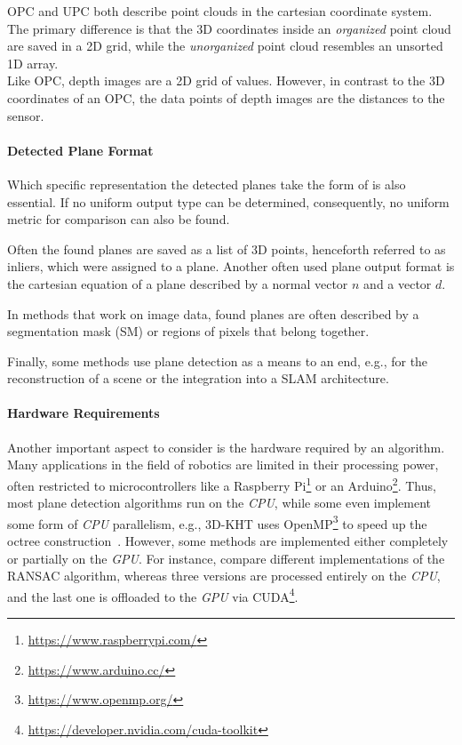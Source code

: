 \documentclass[main.tex]{subfiles}
\begin{document}
OPC and UPC both describe point clouds in the cartesian coordinate system. The primary difference is that the 3D coordinates inside
an \textit{organized} point cloud are saved in a 2D grid, while the \textit{unorganized} point cloud resembles an unsorted 1D array.\\
Like OPC, depth images are a 2D grid of values. However, in contrast to the 3D coordinates of an OPC, the data points of depth images
are the distances to the sensor.



\paragraph{Detected Plane Format} \label{subsec:planeformat}
Which specific representation the detected planes take the form of is also essential.
If no uniform output type can be determined, consequently, no uniform metric for comparison can also be found.


Often the found planes are saved as a list of 3D points, henceforth referred to as inliers, which were assigned to a plane.
Another often used plane output format is the cartesian equation of a plane described by a normal vector $n$ and a vector $d$.

In methods that work on image data, found planes are often described by a segmentation mask (SM) or regions of pixels that belong together.

Finally, some methods use plane detection as a means to an end, e.g., for the reconstruction of a scene or the integration into
a SLAM architecture.

\paragraph{Hardware Requirements}
\label{par:hardware}
Another important aspect to consider is the hardware required by an algorithm.
Many applications in the field of robotics are limited in their processing power, often restricted to microcontrollers like
a Raspberry Pi\footnote{\href{https://www.raspberrypi.com/}{https://www.raspberrypi.com/}} or an Arduino\footnote{\href{https://www.arduino.cc/}{https://www.arduino.cc/}}.
Thus, most plane detection algorithms run on the \textit{CPU}, while some even implement some form of \textit{CPU} parallelism, e.g., 3D-KHT uses OpenMP\footnote{\href{https://www.openmp.org/}{https://www.openmp.org/}}
to speed up the octree construction~\cite[Section~4]{LimbergerOliveira2015HT3D}.
However, some methods are implemented either completely or partially on the \textit{GPU}.
For instance, \citeauthor{Hidalgo-Paniagua_Vega-Rodríguez_Pavón_Ferruz_2015}\cite{Hidalgo-Paniagua_Vega-Rodríguez_Pavón_Ferruz_2015} compare different
implementations of the RANSAC algorithm, whereas three versions are processed entirely on the \textit{CPU}, and the last one is offloaded
to the \textit{GPU} via CUDA\footnote{\href{https://developer.nvidia.com/cuda-toolkit}{https://developer.nvidia.com/cuda-toolkit}}.
\end{document}
